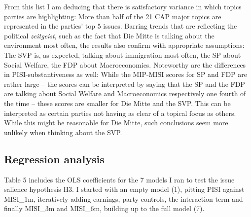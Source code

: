 \documentclass[11pt,a4paper]{article}
\begin{document}
From this list I am deducing that there is satisfactory variance in which topics parties are highlighting: More than half of the 21 CAP major topics are represented in the parties’ top 5 issues. Barring trends that are reflecting the political \textit{zeitgeist}, such as the fact that Die Mitte is talking about the environment most often, the results also confirm with appropriate assumptions: The SVP is, as expected, talking about immigration most often, the SP about Social Welfare, the FDP about Macroeconomics. Noteworthy are the differences in PISI-substantiveness as well: While the MIP-MISI scores for SP and FDP are rather large – the scores can be interpreted by saying that the SP and the FDP are talking about Social Welfare and Macroeconomics respectively one fourth of the time – these scores are smaller for Die Mitte and the SVP. This can be interpreted as certain parties not having as clear of a topical focus as others. While this might be reasonable for Die Mitte, such conclusions seem more unlikely when thinking about the SVP.


\subsection{Regression analysis}
Table 5 includes the OLS coefficients for the 7 models I ran to test the issue salience hypothesis H3. I started with an empty model (1), pitting PISI against MISI\_1m, iteratively adding earnings, party controls, the interaction term and finally MISI\_3m and MISI\_6m, building up to the full model (7).
\end{document}
